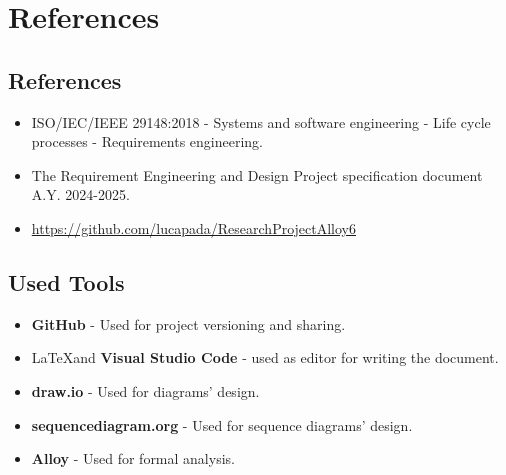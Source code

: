 \chapter{References}
\label{ch:references}

\section{References}
\label{sec:references}

\begin{itemize}
    \item ISO/IEC/IEEE 29148:2018 - Systems and software engineering - Life cycle processes - Requirements engineering.
    \item The Requirement Engineering and Design Project specification document A.Y. 2024-2025.
    \item \url{https://github.com/lucapada/ResearchProjectAlloy6}
\end{itemize}

\section{Used Tools}
\label{sec:used-tools}

\begin{itemize}
    \item \textbf{GitHub} - Used for project versioning and sharing.
    \item \LaTeX \space and \textbf{Visual Studio Code} - used as editor for writing the document.
    \item \textbf{draw.io} - Used for diagrams' design.
    \item \textbf{sequencediagram.org} - Used for sequence diagrams' design.
    \item \textbf{Alloy} - Used for formal analysis.
\end{itemize}

